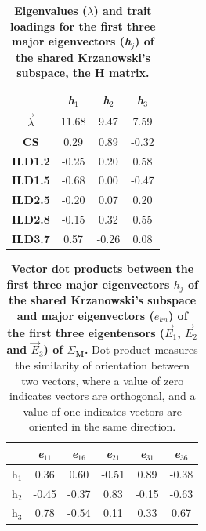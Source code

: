 \begin{table}[!htbp]
\caption[Eigenvalues ($\lambda$) and trait loadings for the first three major eigenvectors (\textit{\textbf{h}}$_{\textit{j}}$) of the shared Krzanowski's subspace, the H matrix.]{\textbf{Eigenvalues ($\lambda$) and trait loadings for the first three major eigenvectors (\textit{\textbf{h}}$_{\textit{j}}$) of the shared Krzanowski's subspace, the H matrix.}}
\label{tab:multi_Heigvals}
\begin{center}
\begin{tabular}{>{\bfseries}cS[table-format=2.2]S[table-format=2.2]S[table-format=2.2]}
\toprule
& {\textit{h}$_{\textit{1}}$} & {\textit{h}$_{\textit{2}}$} & {\textit{h}$_{\textit{3}}$}\\
\midrule
$\vec{\lambda}$ & 11.68 & 9.47 & 7.59 \\
CS & 0.29 & 0.89 & -0.32\\
 ILD1.2 & -0.25 & 0.20 & 0.58\\
 ILD1.5 & -0.68 & 0.00 & -0.47\\
ILD2.5 & -0.20 & 0.07 & 0.20\\
 ILD2.8 & -0.15 & 0.32 & 0.55\\
 ILD3.7 & 0.57 &-0.26 & 0.08\\
\bottomrule
\end{tabular}
\end{center}
\end{table}


\newpage
\begin{table}[!htbp]
\caption[Vector dot products between the first three major eigenvectors $h_j$ of the shared Krzanowski's subspace and major eigenvectors ($e_{kn}$) of the first three eigentensors ($\vec{E}_{1}$, $\vec{E}_{2}$ and $\vec{E}_{3}$) of $\Sigma_{\textbf{M}}$.]{\textbf{Vector dot products between the first three major eigenvectors $h_j$ of the shared Krzanowski's subspace and major eigenvectors ($e_{kn}$) of the first three eigentensors ($\vec{E}_{1}$, $\vec{E}_{2}$ and $\vec{E}_{3}$) of $\Sigma_{\textbf{M}}$.} Dot product measures the similarity of orientation between two vectors, where a value of zero indicates vectors are orthogonal, and a value of one indicates vectors are oriented in the same direction.}
\label{tab:multi_VecDotProd}
\begin{center}
\begin{tabular}{cS[table-format=2.2]S[table-format=2.2]S[table-format=2.2]S[table-format=2.2]S[table-format=2.2]}
\toprule
& {\textit{e}$_{\textit{11}}$} & {\textit{e}$_{\textit{16}}$} &
{\textit{e}$_{\textit{21}}$} & {\textit{e}$_{\textit{31}}$} & {\textit{e}$_{\textit{36}}$} \\
\midrule
$\textit{h}_{1}$  & 0.36	& 0.60	& -0.51 & 0.89	& -0.38\\
$\textit{h}_{2}$  & -0.45	& -0.37	& 0.83	& -0.15	& -0.63\\
$\textit{h}_{3}$  & 0.78	& -0.54	& 0.11	& 0.33	& 0.67 \\
\bottomrule
\end{tabular}
\end{center}
\end{table}

